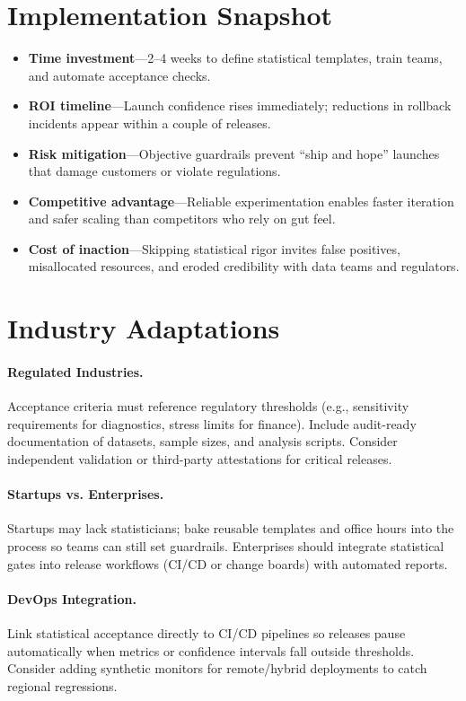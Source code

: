 \section{Implementation Snapshot}
\label{sec:stats-snapshot}
\begin{itemize}
    \item \textbf{Time investment}—2--4 weeks to define statistical templates, train teams, and automate acceptance checks.
    \item \textbf{ROI timeline}—Launch confidence rises immediately; reductions in rollback incidents appear within a couple of releases.
    \item \textbf{Risk mitigation}—Objective guardrails prevent “ship and hope” launches that damage customers or violate regulations.
    \item \textbf{Competitive advantage}—Reliable experimentation enables faster iteration and safer scaling than competitors who rely on gut feel.
    \item \textbf{Cost of inaction}—Skipping statistical rigor invites false positives, misallocated resources, and eroded credibility with data teams and regulators.
\end{itemize}
\section{Industry Adaptations}
\label{sec:stats-industry}
\paragraph{Regulated Industries.} Acceptance criteria must reference regulatory thresholds (e.g., sensitivity requirements for diagnostics, stress limits for finance). Include audit-ready documentation of datasets, sample sizes, and analysis scripts. Consider independent validation or third-party attestations for critical releases.

\paragraph{Startups vs. Enterprises.} Startups may lack statisticians; bake reusable templates and office hours into the process so teams can still set guardrails. Enterprises should integrate statistical gates into release workflows (CI/CD or change boards) with automated reports.

\paragraph{DevOps Integration.} Link statistical acceptance directly to CI/CD pipelines so releases pause automatically when metrics or confidence intervals fall outside thresholds. Consider adding synthetic monitors for remote/hybrid deployments to catch regional regressions.

